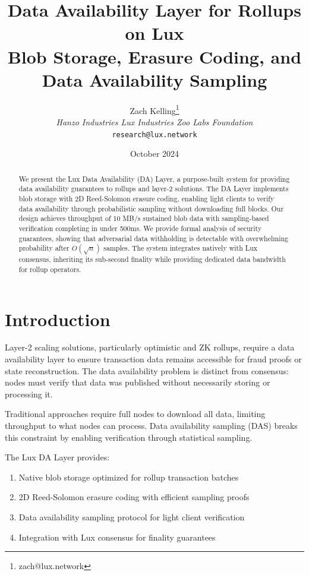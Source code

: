 \documentclass[11pt,a4paper]{article}
\title{Data Availability Layer for Rollups on Lux\\
\large Blob Storage, Erasure Coding, and Data Availability Sampling}
\author{Zach Kelling\thanks{zach@lux.network} \\ \textit{Hanzo Industries \quad Lux Industries \quad Zoo Labs Foundation} \\ \texttt{research@lux.network}}
\date{October 2024}
\begin{document}
\maketitle

\begin{abstract}
We present the Lux Data Availability (DA) Layer, a purpose-built system for providing data availability guarantees to rollups and layer-2 solutions. The DA Layer implements blob storage with 2D Reed-Solomon erasure coding, enabling light clients to verify data availability through probabilistic sampling without downloading full blocks. Our design achieves throughput of 10 MB/s sustained blob data with sampling-based verification completing in under 500ms. We provide formal analysis of security guarantees, showing that adversarial data withholding is detectable with overwhelming probability after $O(\sqrt{n})$ samples. The system integrates natively with Lux consensus, inheriting its sub-second finality while providing dedicated data bandwidth for rollup operators.
\end{abstract}

\section{Introduction}

Layer-2 scaling solutions, particularly optimistic and ZK rollups, require a data availability layer to ensure transaction data remains accessible for fraud proofs or state reconstruction. The data availability problem is distinct from consensus: nodes must verify that data was published without necessarily storing or processing it.

Traditional approaches require full nodes to download all data, limiting throughput to what nodes can process. Data availability sampling (DAS) breaks this constraint by enabling verification through statistical sampling.

The Lux DA Layer provides:

\begin{enumerate}
    \item Native blob storage optimized for rollup transaction batches
    \item 2D Reed-Solomon erasure coding with efficient sampling proofs
    \item Data availability sampling protocol for light client verification
    \item Integration with Lux consensus for finality guarantees
\end{enumerate}
\end{document}
